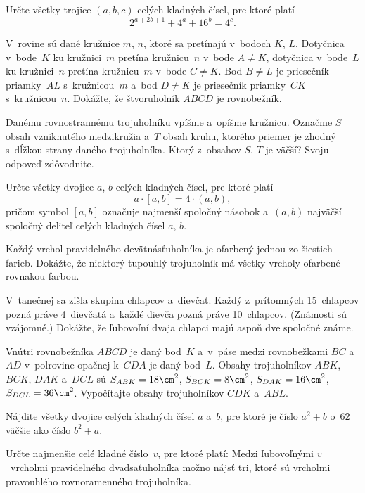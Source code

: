 {%
Určte všetky trojice $(a,b,c)$ celých kladných čísel, pre ktoré platí
$$
2^{a+2b+1}+4^a+16^b=4^c.
$$}

{%
V~rovine sú dané kružnice $m$, $n$, ktoré sa pretínajú v~bodoch $K$, $L$.
Dotyčnica v~bode~$K$ ku kružnici~$m$ pretína kružnicu~$n$ v~bode $A\ne K$,
dotyčnica v~bode~$L$ ku kružnici~$n$ pretína kružnicu~$m$ v~bode $C\ne K$. Bod
$B\ne L$ je priesečník priamky~$AL$ s~kružnicou~$m$ a~bod $D\ne K$ je priesečník
priamky~$CK$ s~kružnicou~$n$. Dokážte, že štvoruholník $ABCD$ je rovnobežník.}

{%
Danému rovnostrannému trojuholníku vpíšme a~opíšme kružnicu.
Označme $S$ obsah vzniknutého medzikružia a~$T$ obsah kruhu, ktorého priemer je zhodný s~dĺžkou strany daného
trojuholníka.
Ktorý z~obsahov $S$, $T$ je väčší? Svoju odpoveď zdôvodnite.
}

{%
Určte všetky dvojice $a$, $b$ celých kladných čísel, pre ktoré platí
$$
a\cdot [a,b]=4\cdot (a,b),
$$
pričom symbol $[a,b]$ označuje najmenší spoločný násobok a~$(a,b)$
najväčší spoločný deliteľ celých kladných čísel $a$, $b$.
}

{%
Každý vrchol pravidelného devätnásťuholníka je ofarbený jednou
zo šiestich farieb. Dokážte, že niektorý tupouhlý trojuholník má všetky vrcholy ofarbené rovnakou farbou.
}

{%
V~tanečnej sa zišla skupina chlapcov a~dievčat. Každý z~prítomných 15~chlapcov pozná práve 4~dievčatá a~každé dievča pozná práve 10~chlapcov. (Známosti sú vzájomné.) Dokážte, že ľubovoľní dvaja chlapci majú aspoň dve spoločné známe.}

{%
Vnútri rovnobežníka $ABCD$ je daný bod~$K$ a~v~páse medzi rovnobežkami $BC$ a~$AD$
v~polrovine opačnej k~$CDA$ je daný bod~$L$. Obsahy trojuholníkov $ABK$,
$BCK$, $DAK$ a~$DCL$ sú $S_{ABK}=18\cm^2$,
$S_{BCK}=8\cm^2$, $S_{DAK}=16\cm^2$, $S_{DCL}=36\cm^2$.
Vypočítajte obsahy trojuholníkov $CDK$ a~$ABL$.}

{%
Nájdite všetky dvojice celých kladných čísel $a$ a~$b$,
pre ktoré je číslo $a^2+b$ o~$62$ väčšie ako číslo $b^2+a$.}

{%
Určte najmenšie celé kladné číslo~$v$, pre ktoré platí: Medzi ľubovoľnými $v$~vrcholmi pravidelného
dvadsaťuholníka možno nájsť tri, ktoré sú vrcholmi
pravouhlého rovnoramenného trojuholníka.}

